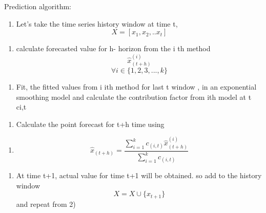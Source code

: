 Prediction algorithm:
\begin{enumerate}
\item  Let's take the  time series history window at time t, $$X=[x_{1},x_{2},.. x_{t}]$$ 
\end{enumerate}
\begin{enumerate}
\item calculate forecasted value for  h- horizon from the i th method $$\hat{x}_{(t+h)}^{(i)}$$ $$\forall i \in \{1,2,3,...,k\}$$ 
\end{enumerate}
\begin{enumerate}
\item Fit, the fitted values from i ith method for last t window ,  in an exponential smoothing model and calculate the contribution factor from ith model at t ci,t
\end{enumerate}
\begin{enumerate}
\item Calculate the point forecast for t+h time using 
\end{enumerate}
\begin{enumerate}
\item $$\hat{x}_{(t+h)}= \frac{\sum_{i=1}^{k}c_{(i,t)} \hat{x}_{(t+h)}^{(i)}}{\sum_{i=1}^{k}c_{(i,t)}}$$
\end{enumerate}
\begin{enumerate}
\item At time t+1,  actual value for time t+1  will be obtained. so add  to the history window $$X=X\cup \{x_{t+1}\}$$ and repeat from 2)
\end{enumerate}
